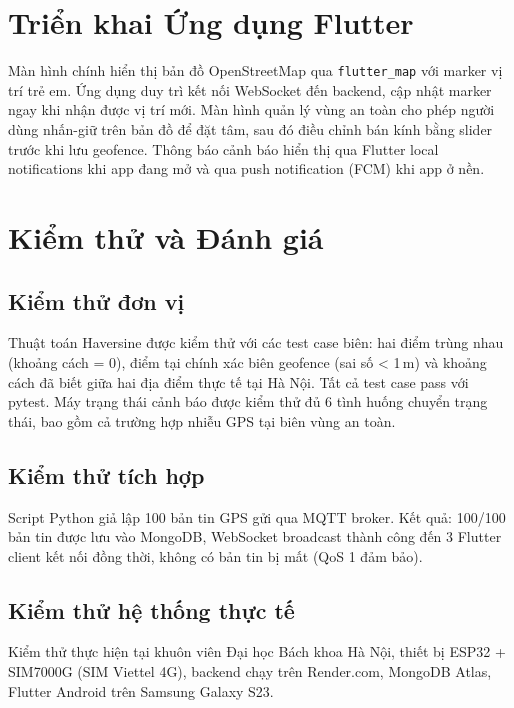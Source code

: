 \documentclass[../DoAn.tex]{subfiles}
\begin{document}
\section{Triển khai Ứng dụng Flutter}

Màn hình chính hiển thị bản đồ OpenStreetMap qua \texttt{flutter\_map} với marker vị trí trẻ em. Ứng dụng duy trì kết nối WebSocket đến backend, cập nhật marker ngay khi nhận được vị trí mới. Màn hình quản lý vùng an toàn cho phép người dùng nhấn-giữ trên bản đồ để đặt tâm, sau đó điều chỉnh bán kính bằng slider trước khi lưu geofence. Thông báo cảnh báo hiển thị qua Flutter local notifications khi app đang mở và qua push notification (FCM) khi app ở nền.

\section{Kiểm thử và Đánh giá}

\subsection{Kiểm thử đơn vị}

Thuật toán Haversine được kiểm thử với các test case biên: hai điểm trùng nhau (khoảng cách = 0), điểm tại chính xác biên geofence (sai số < 1\,m) và khoảng cách đã biết giữa hai địa điểm thực tế tại Hà Nội. Tất cả test case pass với pytest. Máy trạng thái cảnh báo được kiểm thử đủ 6 tình huống chuyển trạng thái, bao gồm cả trường hợp nhiễu GPS tại biên vùng an toàn.

\subsection{Kiểm thử tích hợp}

Script Python giả lập 100 bản tin GPS gửi qua MQTT broker. Kết quả: 100/100 bản tin được lưu vào MongoDB, WebSocket broadcast thành công đến 3 Flutter client kết nối đồng thời, không có bản tin bị mất (QoS 1 đảm bảo).

\subsection{Kiểm thử hệ thống thực tế}

Kiểm thử thực hiện tại khuôn viên Đại học Bách khoa Hà Nội, thiết bị ESP32 + SIM7000G (SIM Viettel 4G), backend chạy trên Render.com, MongoDB Atlas, Flutter Android trên Samsung Galaxy S23.
\end{document}
